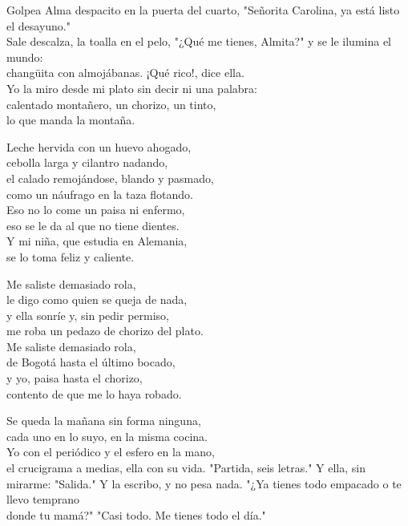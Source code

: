 \begin{lyrics}

Golpea Alma despacito en la puerta del cuarto,
"Señorita Carolina, ya está listo el desayuno."\\
Sale descalza, la toalla en el pelo,
"¿Qué me tienes, Almita?" y se le ilumina el mundo:\\
changüita con almojábanas. ¡Qué rico!, dice ella.\\
Yo la miro desde mi plato sin decir ni una palabra:\\
calentado montañero, un chorizo, un tinto,\\
lo que manda la montaña.

Leche hervida con un huevo ahogado,\\
cebolla larga y cilantro nadando,\\
el calado remojándose, blando y pasmado,\\
como un náufrago en la taza flotando.\\
Eso no lo come un paisa ni enfermo,\\
eso se le da al que no tiene dientes.\\
Y mi niña, que estudia en Alemania,\\
se lo toma feliz y caliente.

Me saliste demasiado rola,\\
le digo como quien se queja de nada,\\
y ella sonríe y, sin pedir permiso,\\
me roba un pedazo de chorizo del plato.\\
Me saliste demasiado rola,\\
de Bogotá hasta el último bocado,\\
y yo, paisa hasta el chorizo,\\
contento de que me lo haya robado.

Se queda la mañana sin forma ninguna,\\
cada uno en lo suyo, en la misma cocina.\\
Yo con el periódico y el esfero en la mano,\\
el crucigrama a medias, ella con su vida.
"Partida, seis letras." Y ella, sin mirarme:
"Salida." Y la escribo, y no pesa nada.
"¿Ya tienes todo empacado o te llevo temprano\\
donde tu mamá?" "Casi todo. Me tienes todo el día."


\end{lyrics}

